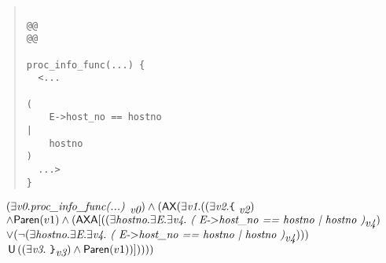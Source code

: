 \documentclass{article}
\newcommand{\U}{\,\mbox{\sf{U}}\,}
\newcommand{\A}{\mbox{\sf{A}}}
\newcommand{\AX}{\mbox{\sf{AX}}}
\newcommand{\mita}[1]{\mbox{\it{{#1}}}}
\newcommand{\msf}[1]{\mbox{\sf{{#1}}}}
\newcommand{\mth}[1]{\({#1}\)}
\newcommand{\ttlb}{\mbox{\tt \char'173}}
\newcommand{\ttrb}{\mbox{\tt \char'175}}
\begin{document}
\begin{quote}\begin{verbatim}

@@
@@

proc_info_func(...) {
  <...
    
(
    E->host_no == hostno
|
    hostno
)
  ...>
}
\end{verbatim}\end{quote}

\[\begin{array}{l}
(\exists \mita{v0} . \mita{proc\_info\_func(...) }_{\mita{v0}}) \wedge (\AX(\exists \mita{v1} . ((\exists \mita{v2} . \mita{{\ttlb}
  }_{\mita{v2}})\\ \wedge \msf{Paren}(v1) \wedge (\AX\A[((\exists \mita{hostno} . \exists \mita{E} . \exists \mita{v4} . \mita{
(
E-\mth{>}host\_no == hostno
|
hostno
)}_{\mita{v4}})\\ \vee (\neg (\exists \mita{hostno} . \exists \mita{E} . \exists \mita{v4} . \mita{
(
E-\mth{>}host\_no == hostno
|
hostno
)}_{\mita{v4}})))\\ \U ((\exists \mita{v3} . \mita{
{\ttrb}}_{\mita{v3}}) \wedge \msf{Paren}(v1))]
))))
\end{array}\]
\end{document}
